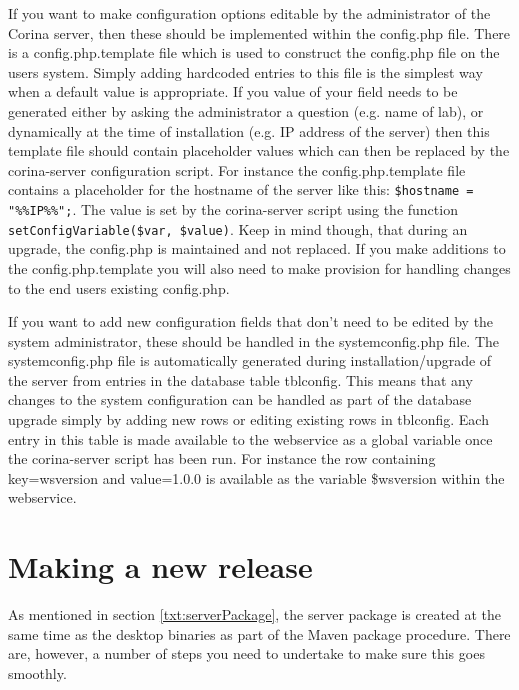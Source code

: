 If you want to make configuration options editable by the administrator of the Corina server, then these should be implemented within the config.php file.  There is a config.php.template file which is used to construct the config.php file on the users system.  Simply adding hardcoded entries to this file is the simplest way when a default value is appropriate.  If you value of your field needs to be generated either by asking the administrator a question (e.g. name of lab), or dynamically at the time of installation (e.g. IP address of the server) then this template file should contain placeholder values which can then be replaced by the corina-server configuration script.  For instance the config.php.template file contains a placeholder for the hostname of the server like this: \verb|$hostname = "%%IP%%";|.  The value is set by the corina-server script using the function \verb|setConfigVariable($var, $value)|.  Keep in mind though, that during an upgrade, the config.php is maintained and not replaced.  If you make additions to the config.php.template you will also need to make provision for handling changes to the end users existing config.php.

If you want to add new configuration fields that don't need to be edited by the system administrator, these should be handled in the systemconfig.php file.  The systemconfig.php file is automatically generated during installation/upgrade of the server from entries in the database table tblconfig.  This means that any changes to the system configuration can be handled as part of the database upgrade simply by adding new rows or editing existing rows in tblconfig.  Each entry in this table is made available to the webservice as a global variable once the corina-server script has been run.  For instance the row containing key=wsversion and value=1.0.0 is available as the variable \$wsversion within the webservice. 



\section{Making a new release}

As mentioned in section \ref{txt:serverPackage}, the server package is created at the same time as the desktop binaries as part of the Maven package procedure.  There are, however, a number of steps you need to undertake to make sure this goes smoothly.

